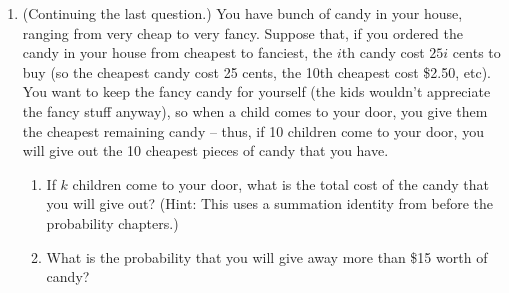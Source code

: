 \documentclass[11pt]{article}
\begin{document}
\begin{enumerate}
    \item (Continuing the last question.) You have bunch of candy in your house, ranging from very cheap to very fancy. Suppose that, if you ordered the candy in your house from cheapest to fanciest, the $i$th candy cost $25i$ cents to buy (so the cheapest candy cost 25 cents, the 10th cheapest cost \$2.50, etc). You want to keep the fancy candy for yourself (the kids wouldn't appreciate the fancy stuff anyway), so when a child comes to your door, you give them the cheapest remaining candy -- thus, if 10 children come to your door, you will give out the 10 cheapest pieces of candy that you have. 
        \begin{enumerate}
            \item If $k$ children come to your door, what is the total cost of the candy that you will give out? (Hint: This uses a summation identity from before the probability chapters.)
            \item What is the probability that you will give away more than \$15 worth of candy?
        \end{enumerate}
\end{enumerate}
\end{document}
